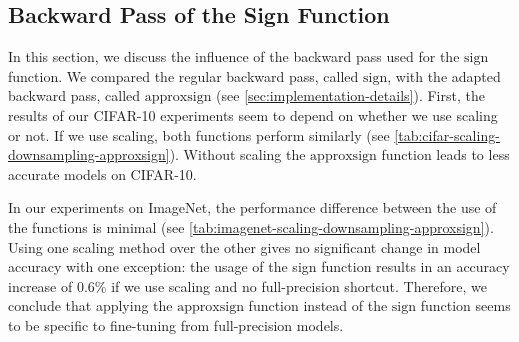 \documentclass[10pt,twocolumn,letterpaper]{article}
\begin{document}
\subsection{Backward Pass of the Sign Function}\label{sec:results-approx}

In this section, we discuss the influence of the backward pass used for the $\mathrm{sign}$ function.
We compared the regular backward pass, called $\mathrm{sign}$, with the adapted backward pass, called $\mathrm{approxsign}$ (see \autoref{sec:implementation-details}).
First, the results of our CIFAR-10 experiments seem to depend on whether we use scaling or not.
If we use scaling, both functions perform similarly (see \autoref{tab:cifar-scaling-downsampling-approxsign}).
Without scaling the $\mathrm{approxsign}$ function leads to less accurate models on CIFAR-10.

In our experiments on ImageNet, the performance difference between the use of the functions is minimal (see \autoref{tab:imagenet-scaling-downsampling-approxsign}). 
Using one scaling method over the other gives no significant change in model accuracy with one exception: the usage of the sign function results in an accuracy increase of 0.6\% if we use scaling and no full-precision shortcut.
Therefore, we conclude that applying the $\mathrm{approxsign}$ function instead of the $\mathrm{sign}$ function seems to be specific to fine-tuning from full-precision models.
\end{document}
